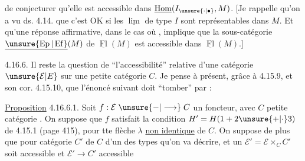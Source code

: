 de conjecturer qu'elle est accessible dans
$\underline{\operatorname{Hom}}(I_{\unsure{\cdot|\bullet}},M)$. [Je rappelle qu'on a vu
ds. 4.14. que c'est OK si les $\underline{\lim}$ de type
$I$ sont représentables dans $M$. Et qu'une
réponse affirmative, dans le cas où
, implique
que la sous-catégorie $\underline{\unsure{\operatorname{Ep}|\operatorname{Ef}}}(M)$ de $\underline{\operatorname{Fl}}(M)$
est accessible dans $\underline{\operatorname{Fl}}(M)$.]

4.16.6. Il reste la question de ``l'accessibilité''
relative d'une catégorie $\unsure{\mathcal E|E}$ sur une
petite catégorie $C$. Je pense à présent,
grâce à 4.15.9, et son cor. 4.15.10, que l'énoncé suivant doit ``tomber'' par  :

\uline{Proposition} 4.16.6.1. Soit $f:\mathcal E\mathrel{\unsure{-|\longrightarrow}}C$ un
foncteur, avec $C$ petite catégorie .
On suppose que $f$ satisfait la condition
$H'=H(1+2\unsure{+|\cdot}3)$ de 4.15.1 (page 415),  pour tte
flèche $\lambda$ \uline{non identique} de $C$. On suppose de
plus que pour  catégorie $C'$
 de $C$ d'un des  types qu'on va décrire, et un 
$\mathcal E'=\mathcal E\times_C C'$ soit accessible et $\mathcal E'\longrightarrow C'$ accessible
